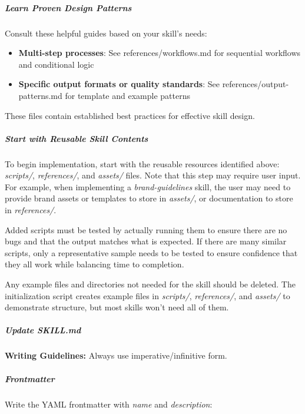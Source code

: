 \documentclass[11pt]{article}
\begin{document}
\subparagraph{Learn Proven Design Patterns}\mbox{}\par

Consult these helpful guides based on your skill's needs:


\begin{itemize}[leftmargin=*,itemsep=2pt,topsep=2pt]
\item {} \textbf{Multi-step processes}: See references/workflows.md for sequential workflows and conditional logic
\item {} \textbf{Specific output formats or quality standards}: See references/output-patterns.md for template and example patterns
\end{itemize}

These files contain established best practices for effective skill design.


\subparagraph{Start with Reusable Skill Contents}\mbox{}\par

To begin implementation, start with the reusable resources identified above: \emph{scripts/}, \emph{references/}, and \emph{assets/} files. Note that this step may require user input. For example, when implementing a \emph{brand-guidelines} skill, the user may need to provide brand assets or templates to store in \emph{assets/}, or documentation to store in \emph{references/}.


Added scripts must be tested by actually running them to ensure there are no bugs and that the output matches what is expected. If there are many similar scripts, only a representative sample needs to be tested to ensure confidence that they all work while balancing time to completion.


Any example files and directories not needed for the skill should be deleted. The initialization script creates example files in \emph{scripts/}, \emph{references/}, and \emph{assets/} to demonstrate structure, but most skills won't need all of them.


\subparagraph{Update SKILL.md}\mbox{}\par

\textbf{Writing Guidelines:} Always use imperative/infinitive form.


\subparagraph{Frontmatter}\mbox{}\par

Write the YAML frontmatter with \emph{name} and \emph{description}:
\end{document}
